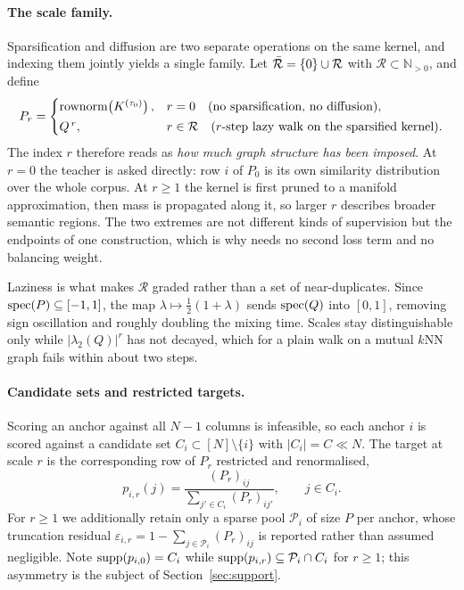\paragraph{The scale family.}
Sparsification and diffusion are two separate operations on the same kernel, and
indexing them jointly yields a single family. Let
$\bar{\mathcal{R}} = \{0\}\cup\mathcal{R}$ with $\mathcal{R}\subset\mathbb{N}_{>0}$, and define
\begin{equation}
    P_r =
    \begin{cases}
        \mathrm{rownorm}\!\left(K^{(\tau_0)}\right), & r = 0 \quad\text{(no sparsification, no diffusion)},\\[2pt]
        Q^{\,r}, & r \in \mathcal{R} \quad\text{($r$-step lazy walk on the sparsified kernel)}.
    \end{cases}
    \label{eq:family}
\end{equation}
The index $r$ therefore reads as \emph{how much graph structure has been imposed}. At $r=0$
the teacher is asked directly: row $i$ of $P_0$ is its own similarity distribution over the
whole corpus. At $r\geq 1$ the kernel is first pruned to a manifold approximation, then mass
is propagated along it, so larger $r$ describes broader semantic regions. The two extremes
are not different kinds of supervision but the endpoints of one construction, which is why
\method needs no second loss term and no balancing weight.

Laziness is what makes $\mathcal{R}$ graded rather than a set of near-duplicates. Since
$\mathrm{spec}(P)\subseteq[-1,1]$, the map $\lambda\mapsto\frac{1}{2}(1+\lambda)$ sends $\mathrm{spec}(Q)$
into $[0,1]$, removing sign oscillation and roughly doubling the mixing time. Scales stay
distinguishable only while $|\lambda_2(Q)|^{r}$ has not decayed, which for a plain walk on a
mutual $k$NN graph fails within about two steps.

\paragraph{Candidate sets and restricted targets.}
Scoring an anchor against all $N-1$ columns is infeasible, so each anchor $i$ is scored
against a candidate set $C_i\subset[N]\setminus\{i\}$ with $|C_i| = C \ll N$. The target
at scale $r$ is the corresponding row of $P_r$ restricted and renormalised,
\begin{equation}
    p_{i,r}(j) = \frac{(P_r)_{ij}}{\sum_{j'\in C_i}(P_r)_{ij'}},
    \qquad j \in C_i .
    \label{eq:target}
\end{equation}
For $r\geq1$ we additionally retain only a sparse pool $\mathcal{P}_i$ of size $P$ per
anchor, whose truncation residual
$\varepsilon_{i,r} = 1-\sum_{j\in\mathcal{P}_i}(P_r)_{ij}$ is reported rather than assumed
negligible. Note $\mathrm{supp}(p_{i,0}) = C_i$ while $\mathrm{supp}(p_{i,r})\subseteq \mathcal{P}_i\cap C_i$
for $r\geq1$; this asymmetry is the subject of Section~\ref{sec:support}.

